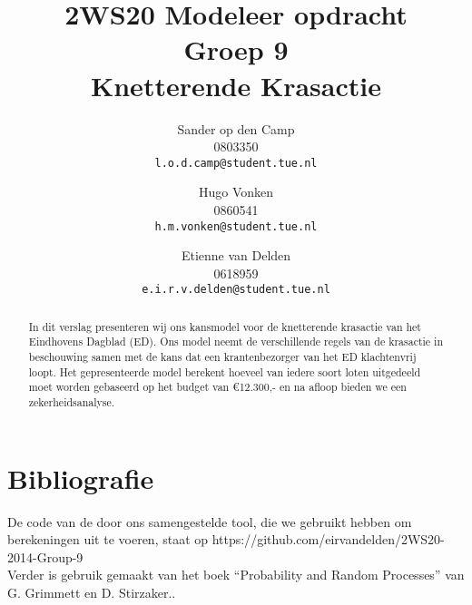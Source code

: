 \documentclass[a4paper, oneside, book]{memoir}
\title{{\small 2WS20 Modeleer opdracht}\\ \small Groep 9\\ \huge{\textbf{ Knetterende Krasactie}}}
\author{
  Sander op den Camp\\
  0803350\\
  \texttt{l.o.d.camp@student.tue.nl}
  \and
  Hugo Vonken\\
  0860541\\
  \texttt{h.m.vonken@student.tue.nl}
  \and
  Etienne van Delden\\
  0618959\\
  \texttt{e.i.r.v.delden@student.tue.nl}
}
\begin{document}
\frontmatter
\maketitle
\thispagestyle{empty}

\begin{abstract}
  In dit verslag presenteren wij ons kansmodel voor de knetterende krasactie van het Eindhovens Dagblad (ED). 
Ons model neemt de verschillende regels van de krasactie in beschouwing samen met de kans dat een krantenbezorger van het ED klachtenvrij loopt. 
Het gepresenteerde model berekent hoeveel van iedere soort loten uitgedeeld moet worden gebaseerd op het budget van \euro12.300,- en na afloop bieden we een zekerheidsanalyse.
  
\begin{comment}
In this report we present our probability model for the ``End of year'' lottery of the dutch newspaper ``Eindhovens Dagblad'' (ED).
Our model takes the different rules of the lottery into account, along with the probability of the complaint free performance of the distributors of the ED.
The presented model calculates how many variants of each lottery ticket must be made, based on the expected budget of \euro12.300,-.
\end{comment}
\end{abstract}
\newpage

\tableofcontents


\mainmatter






\chapter{Bibliografie}
De code van de door ons samengestelde tool, die we gebruikt hebben om berekeningen uit te voeren, staat op https://github.com/eirvandelden/2WS20-2014-Group-9\\

Verder is gebruik gemaakt van het boek ``Probability and Random Processes'' van G. Grimmett en D. Stirzaker..
\end{document}
